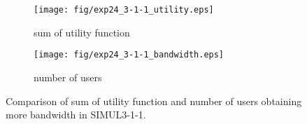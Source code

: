 \begin{figure}
	\begin{center}
		\begin{subfigure}[b]{0.8\textwidth}
			\centering
			\texttt{[image: fig/exp24\_3-1-1\_utility.eps]}
			\caption{sum of utility function}
			\label{figure:simul3_1_1_u_a}
		\end{subfigure}
		\begin{subfigure}[b]{0.8\textwidth}
			\centering
			\texttt{[image: fig/exp24\_3-1-1\_bandwidth.eps]}
			\caption{number of users}
			\label{figure:simul3_1_1_u_b}
		\end{subfigure}
		\caption{Comparison of sum of utility function and number of users obtaining more bandwidth in SIMUL3-1-1.}
		\label{figure:simul3_1_1_u}
	\end{center}
\end{figure}

\clearpage

